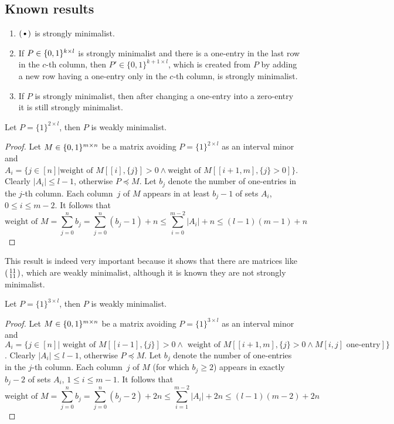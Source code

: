 \subsection{Known results}
\begin{fct}
\begin{enumerate}
\item $\left(\begin{smallmatrix}\bullet\end{smallmatrix}\right)$ is strongly minimalist.
\item If $P\in\{0,1\}^{k\times l}$ is strongly minimalist and there is a one-entry in the last row in the $c$-th column, then $P'\in\{0,1\}^{k+1\times l}$, which is created from $P$ by adding a new row having a one-entry only in the $c$-th column, is strongly minimalist.
\item If $P$ is strongly minimalist, then after changing a one-entry into a zero-entry it is still strongly minimalist.
\end{enumerate}
\end{fct}
\begin{fct}
Let $P=\{1\}^{2\times l}$, then $P$ is weakly minimalist.
\end{fct}
\begin{proof}
Let $M\in\{0,1\}^{m\times n}$ be a matrix avoiding $P=\{1\}^{2\times l}$ as an interval minor and $A_i=\{j\in[n]|\text{weight of }M[[i],\{j\}]>0\wedge \text{weight of }M[[i+1,m],\{j\}>0]\}$. Clearly $|A_i|\leq l-1$, otherwise $P\preceq M$. Let $b_j$ denote the number of one-entries in the $j$-th column. Each column~$j$ of $M$ appears in at least $b_j-1$ of sets $A_i$, $0\leq i\leq m-2$. It follows that
$$\text{weight of }M=\sum\limits_{j=0}^nb_j=\sum\limits_{j=0}^n(b_j-1)+n\leq\sum\limits_{i=0}^{m-2}|A_i|+n\leq(l-1)(m-1)+n$$
\end{proof}
This result is indeed very important because it shows that there are matrices like $\left(\begin{smallmatrix}11\\11\end{smallmatrix}\right)$, which are weakly minimalist, although it is known they are not strongly minimalist.
\begin{fct}
Let $P=\{1\}^{3\times l}$, then $P$ is weakly minimalist.
\end{fct}
\begin{proof}
Let $M\in\{0,1\}^{m\times n}$ be a matrix avoiding $P=\{1\}^{3\times l}$ as an interval minor and $A_i=\{j\in[n]|\text{ weight of }M[[i-1],\{j\}]>0\wedge \text{ weight of }M[[i+1,m],\{j\}>0\wedge M[i,j]\text{ one-entry}]\}$. Clearly $|A_i|\leq l-1$, otherwise $P\preceq M$. Let $b_j$ denote the number of one-entries in the $j$-th column. Each column~$j$ of $M$ (for which $b_j\geq2$) appears in exactly $b_j-2$ of sets $A_i$, $1\leq i\leq m-1$. It follows that
$$\text{weight of }M=\sum\limits_{j=0}^nb_j=\sum\limits_{j=0}^n(b_j-2)+2n\leq\sum\limits_{i=1}^{m-2}|A_i|+2n\leq(l-1)(m-2)+2n$$
\end{proof}